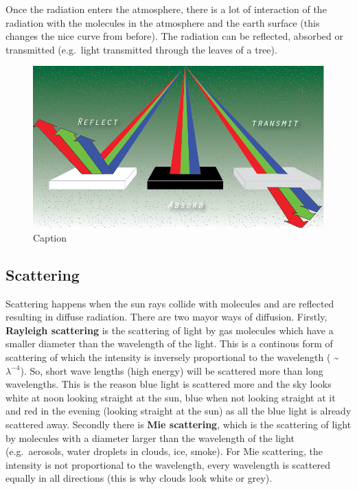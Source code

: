 \documentclass[12pt,oneside]{book}
\begin{document}
Once the radiation enters the atmosphere, there is a lot of interaction
of the radiation with the molecules in the atmosphere and the earth
surface (this changes the nice curve from before). The radiation can be
reflected, absorbed or transmitted (e.g.~light transmitted through the
leaves of a tree).

\begin{figure}

{\centering \includegraphics[width=0.5\linewidth]{figures/Figure123} 

}

\caption{Caption}\label{fig:Spectrum2}
\end{figure}

\subsection{Scattering}\label{scattering}

Scattering happens when the sun rays collide with molecules and are
reflected resulting in diffuse radiation. There are two mayor ways of
diffusion. Firstly, \textbf{Rayleigh scattering} is the scattering of
light by gas molecules which have a smaller diameter than the wavelength
of the light. This is a continous form of scattering of which the
intensity is inversely proportional to the wavelength (
\textasciitilde{} \(\lambda^{-4}\)). So, short wave lengths (high
energy) will be scattered more than long wavelengths. This is the reason
blue light is scattered more and the sky looks white at noon looking
straight at the sun, blue when not looking straight at it and red in the
evening (looking straight at the sun) as all the blue light is already
scattered away. Secondly there is \textbf{Mie scattering}, which is the
scattering of light by molecules with a diameter larger than the
wavelength of the light (e.g.~aerosols, water droplets in clouds, ice,
smoke). For Mie scattering, the intensity is not proportional to the
wavelength, every wavelength is scattered equally in all directions
(this is why clouds look white or grey).
\end{document}
